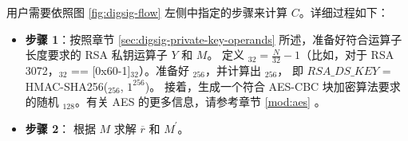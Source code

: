 \documentclass[main\_\_CN.tex]{subfiles}
\begin{document}
用户需要依照图 \ref{fig:digsig-flow} 左侧中指定的步骤来计算 \begin{math}C\end{math}。详细过程如下：

\begin{itemize}

    \item {\bfseries 步骤 1}：按照章节 \ref{sec:digsig-private-key-operands} 所述，准备好符合运算子长度要求的 RSA 私钥运算子 \begin{math}Y\end{math} 和 \begin{math}M\end{math}。
          定义 \begin{math}[L]_{32} = \frac{N}{32}-1 \end{math}（比如，对于 RSA 3072，\begin{math}[L]_{32}\end{math} == [0x60-1]\begin{math}_{32}\end{math}）。准备好 \begin{math}[HMAC\_KEY]_{256}\end{math}，并计算出 \begin{math}[RSA\_DS\_KEY]_{256}\end{math}， 即 \begin{math}RSA\_DS\_KEY\end{math} = HMAC-SHA256(\begin{math}[HMAC\_KEY]_{256}\end{math}, \begin{math}1^{256}\end{math})。 接着，生成一个符合 AES-CBC 块加密算法要求的随机 \begin{math}[IV]_{128}\end{math}。有关 AES 的更多信息，请参考章节 \ref{mod:aes} \textit{}。

    \item {\bfseries 步骤 2}：
          根据 \begin{math}M\end{math} 求解 \begin{math}\overline{r}\end{math} 和 \begin{math}M^{\prime} \end{math}。


\end{itemize}
\end{document}
